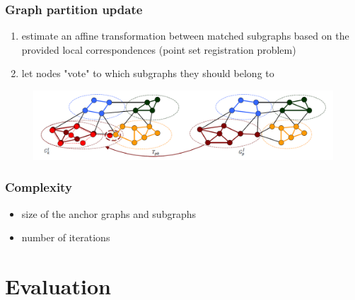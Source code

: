 \documentclass[hyperref={pdfpagelabels=false}]{beamer}
\begin{document}
\begin{frame}
\frametitle{Graph partition update}
\begin{enumerate}
\item estimate an affine transformation between matched subgraphs based on the provided local correspondences (point set registration problem)
\item let nodes "vote" to which subgraphs they should belong to
\end{enumerate}
\begin{figure} [h]
	\centering
	\includegraphics[scale=0.35]{fig/update.png}
\end{figure}
\end{frame}
\begin{frame}
\frametitle{Complexity}
\begin{itemize}
\item size of the anchor graphs and subgraphs
\item number of iterations
\end{itemize}



\end{frame}
\section{Evaluation} 
\end{document}
